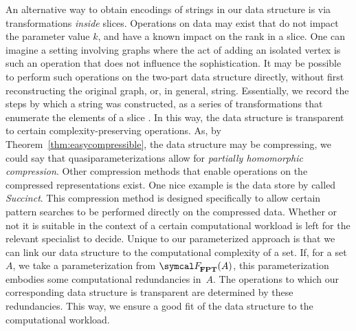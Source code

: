 An alternative way to obtain encodings of strings in our data structure is via transformations \emph{inside} slices.
Operations on data may exist that do not impact the parameter value $k$, and have a known impact on the rank in a slice.
One can imagine a setting involving graphs where the act of adding an isolated vertex is such an operation that does not influence the sophistication.
It may be possible to perform such operations on the two-part data structure directly, without first reconstructing the original graph, or, in general, string.
Essentially, we record the steps by which a string was constructed, as a series of transformations that enumerate the elements of a slice \parencite[see also][Theorem~4.2]{hemachandra1991sets}.
In this way, the data structure is transparent to certain complexity-preserving operations.
As, by Theorem~\ref{thm:easycompressible}, the data structure may be compressing, we could say that quasiparameterizations allow for \emph{partially homomorphic compression}.
Other compression methods that enable operations on the compressed representations exist.
One nice example is the data store by \textcite{agarwal2015succinct} called \emph{Succinct}.
This compression method is designed specifically to allow certain pattern searches to be performed directly on the compressed data.
Whether or not it is suitable in the context of a certain computational workload is left for the relevant specialist to decide.
Unique to our parameterized approach is that we can link our data structure to the computational complexity of a set.
If, for a set~$A$, we take a parameterization from $\calF_\cl{FPT}(A)$, this parameterization embodies some computational redundancies in~$A$.
The operations to which our corresponding data structure is transparent are determined by these redundancies.
This way, we ensure a good fit of the data structure to the computational workload.
